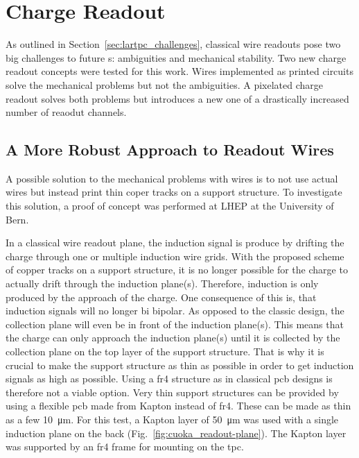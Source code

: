 \section{Charge Readout}
\label{sec:studies_charge-ro}

As outlined in Section~\ref{sec:lartpc_challenges}, classical wire readouts pose two big challenges to future \lartpc{}s: ambiguities and mechanical stability.
Two new charge readout concepts were tested for this work.
Wires implemented as printed circuits solve the mechanical problems but not the ambiguities.
A pixelated charge readout solves both problems but introduces a new one of a drastically increased number of reaodut channels.


\subsection{A More Robust Approach to  Readout Wires}
\label{sec:studies_charge-ro_cuoka}

A possible solution to the mechanical problems with wires is to not use actual wires but instead print thin coper tracks on a support structure.
To investigate this solution, a proof of concept was performed at LHEP at the University of Bern.

In a classical wire readout plane, the induction signal is produce by drifting the charge through one or multiple induction wire grids.
With the proposed scheme of copper tracks on a support structure, it is no longer possible for the charge to actually drift through the induction plane(s).
Therefore, induction is only produced by the approach of the charge.
One consequence of this is, that induction signals will no longer bi bipolar.
As opposed to the classic design, the collection plane will even be in front of the induction plane(s).
This means that the charge can only approach the induction plane(s) until it is collected by the collection plane on the top layer of the support structure.
That is why it is crucial to make the support structure as thin as possible in order to get induction signals as high as possible.
Using a \gls{fr4} structure as in classical \gls{pcb} designs is therefore not a viable option.
Very thin support structures can be provided by using a flexible \gls{pcb} made from Kapton instead of \gls{fr4}.
These can be made as thin as a few \SI{10}{\micro\metre}.
For this test, a Kapton layer of \SI{50}{\micro\metre} was used with a single induction plane on the back (Fig.~\ref{fig:cuoka_readout-plane}).
The Kapton layer was supported by an \gls{fr4} frame for mounting on the \gls{tpc}.

